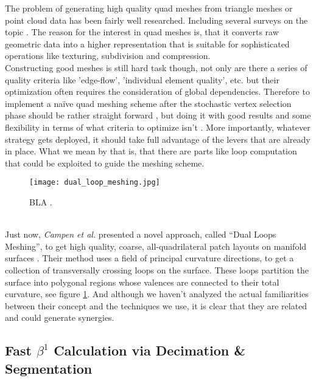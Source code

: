 The problem of generating high quality quad meshes from triangle meshes or point cloud data has been fairly well researched.
Including several surveys on the topic \citep[cf. ][]{Alliez2005, Hormann2007}.
The reason for the interest in quad meshes is, that it converts raw geometric data into a higher representation that is suitable for sophisticated operations like texturing, subdivision and compression.\\
Constructing good meshes is still hard task though, not only are there a series of quality criteria like 'edge-flow', 'individual element quality', etc. but their optimization often requires the consideration of global dependencies.
Therefore to implement a naïve quad meshing scheme after the stochastic vertex selection phase should be rather straight forward \citep[cf.][]{Li2009}, but doing it with good results and some flexibility in terms of what criteria to optimize isn't \citep[][]{Bommes2009}.
More importantly, whatever strategy gets deployed, it should take full advantage of the levers that are already in place.
What we mean by that is, that there are parts like loop computation that could be exploited to guide the meshing scheme.
\begin{figure}[ht]
\centering
\texttt{[image: dual\_loop\_meshing.jpg]}
\caption{BLA \citep[cf.][]{Campen2012}.}
\label{fig:dual_loop_meshing}
\end{figure}\\
Just now, \textit{Campen et al.} presented a novel approach, called ``Dual Loops Meshing'', to get high quality, coarse, all-quadrilateral patch layouts on manifold surfaces \citep[][]{Campen2012}.
Their method uses a field of principal curvature directions, to get a collection of transversally crossing loops on the surface.
These loops partition the surface into polygonal regions whose valences are connected to their total curvature, see figure \ref{fig:dual_loop_meshing}.
And although we haven't analyzed the actual familiarities between their concept and the techniques we use, it is clear that they are related and could generate synergies.

\subsection{Fast $\beta^{1}$ Calculation via Decimation \& Segmentation}
\label{conclusion22}

